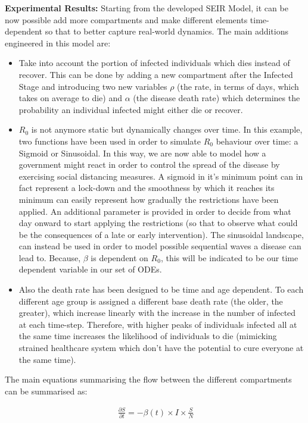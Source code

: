 \textbf{Experimental Results:} Starting from the developed SEIR Model, it can be now possible add more compartments and make different elements time-dependent so that to better capture real-world dynamics. The main additions engineered in this model are:
\begin{itemize}
    \item Take into account the portion of infected individuals which dies instead of recover. This can be done by adding a new compartment after the Infected Stage and introducing two new variables $\rho$ (the rate, in terms of days, which takes on average to die) and $\alpha$ (the disease death rate) which determines the probability an individual infected might either die or recover.
    \item $R_{0}$ is not anymore static but dynamically changes over time. In this example, two functions have been used  in order to simulate $R_{0}$ behaviour over time: a Sigmoid or Sinusoidal. In this way, we are now able to model
    how a government might react in order to control the spread of the disease by exercising social distancing measures. A sigmoid in it's minimum point can in fact represent a lock-down and the smoothness by which it reaches its minimum can
    easily represent how gradually the restrictions have been applied. An additional parameter is provided in order to decide from what day onward to start applying the restrictions (so that to observe what could be the consequences of a late or early intervention). The sinusoidal landscape, can instead be used in order to model possible sequential waves a disease can lead to. Because, $\beta$ is dependent on  $R_{0}$, this will be indicated to be our time dependent variable in our set of ODEs. 
    \item Also the death rate has been designed to be time and age dependent. To each different age group is assigned a different base death rate (the older, the greater), which increase linearly with the increase in the number of infected at each time-step. Therefore, with higher peaks of individuals infected all at the same time increases the likelihood of individuals to die (mimicking strained healthcare system which don't have the potential to cure everyone at the same time).
\end{itemize}

The main equations summarising the flow between the different compartments can be summarised as:

\useshortskip
\begin{align}
\ \frac{\partial S}{\partial t} = -\beta(t) \times I \times \frac{S}{N}
\end{align}
\useshortskip

